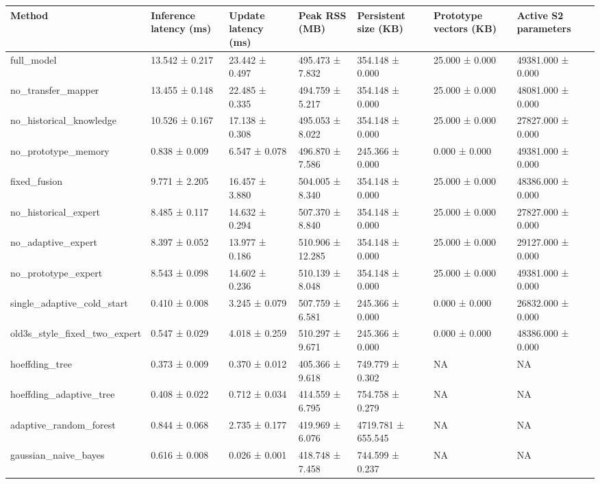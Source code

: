 \begin{tabular}{lllllll}
\toprule
Method & Inference latency (ms) & Update latency (ms) & Peak RSS (MB) & Persistent size (KB) & Prototype vectors (KB) & Active S2 parameters \\
\midrule
full\_model & 13.542 ± 0.217 & 23.442 ± 0.497 & 495.473 ± 7.832 & 354.148 ± 0.000 & 25.000 ± 0.000 & 49381.000 ± 0.000 \\
no\_transfer\_mapper & 13.455 ± 0.148 & 22.485 ± 0.335 & 494.759 ± 5.217 & 354.148 ± 0.000 & 25.000 ± 0.000 & 48081.000 ± 0.000 \\
no\_historical\_knowledge & 10.526 ± 0.167 & 17.138 ± 0.308 & 495.053 ± 8.022 & 354.148 ± 0.000 & 25.000 ± 0.000 & 27827.000 ± 0.000 \\
no\_prototype\_memory & 0.838 ± 0.009 & 6.547 ± 0.078 & 496.870 ± 7.586 & 245.366 ± 0.000 & 0.000 ± 0.000 & 49381.000 ± 0.000 \\
fixed\_fusion & 9.771 ± 2.205 & 16.457 ± 3.880 & 504.005 ± 8.340 & 354.148 ± 0.000 & 25.000 ± 0.000 & 48386.000 ± 0.000 \\
no\_historical\_expert & 8.485 ± 0.117 & 14.632 ± 0.294 & 507.370 ± 8.840 & 354.148 ± 0.000 & 25.000 ± 0.000 & 27827.000 ± 0.000 \\
no\_adaptive\_expert & 8.397 ± 0.052 & 13.977 ± 0.186 & 510.906 ± 12.285 & 354.148 ± 0.000 & 25.000 ± 0.000 & 29127.000 ± 0.000 \\
no\_prototype\_expert & 8.543 ± 0.098 & 14.602 ± 0.236 & 510.139 ± 8.048 & 354.148 ± 0.000 & 25.000 ± 0.000 & 49381.000 ± 0.000 \\
single\_adaptive\_cold\_start & 0.410 ± 0.008 & 3.245 ± 0.079 & 507.759 ± 6.581 & 245.366 ± 0.000 & 0.000 ± 0.000 & 26832.000 ± 0.000 \\
old3s\_style\_fixed\_two\_expert & 0.547 ± 0.029 & 4.018 ± 0.259 & 510.297 ± 9.671 & 245.366 ± 0.000 & 0.000 ± 0.000 & 48386.000 ± 0.000 \\
hoeffding\_tree & 0.373 ± 0.009 & 0.370 ± 0.012 & 405.366 ± 9.618 & 749.779 ± 0.302 & NA & NA \\
hoeffding\_adaptive\_tree & 0.408 ± 0.022 & 0.712 ± 0.034 & 414.559 ± 6.795 & 754.758 ± 0.279 & NA & NA \\
adaptive\_random\_forest & 0.844 ± 0.068 & 2.735 ± 0.177 & 419.969 ± 6.076 & 4719.781 ± 655.545 & NA & NA \\
gaussian\_naive\_bayes & 0.616 ± 0.008 & 0.026 ± 0.001 & 418.748 ± 7.458 & 744.599 ± 0.237 & NA & NA \\
\bottomrule
\end{tabular}
